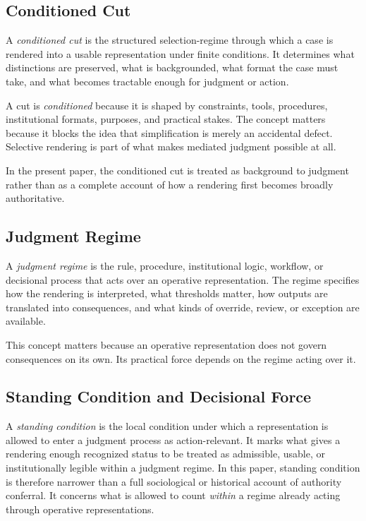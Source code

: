 \documentclass[11pt]{article}
\renewcommand{\emph}[1]{\textit{#1}}
\begin{document}
\subsection{Conditioned Cut}

A \emph{conditioned cut} is the structured selection-regime through which a case is rendered into a usable representation under finite conditions. It determines what distinctions are preserved, what is backgrounded, what format the case must take, and what becomes tractable enough for judgment or action.

A cut is \emph{conditioned} because it is shaped by constraints, tools, procedures, institutional formats, purposes, and practical stakes. The concept matters because it blocks the idea that simplification is merely an accidental defect. Selective rendering is part of what makes mediated judgment possible at all.

In the present paper, the conditioned cut is treated as background to judgment rather than as a complete account of how a rendering first becomes broadly authoritative.

\subsection{Judgment Regime}

A \emph{judgment regime} is the rule, procedure, institutional logic, workflow, or decisional process that acts over an operative representation. The regime specifies how the rendering is interpreted, what thresholds matter, how outputs are translated into consequences, and what kinds of override, review, or exception are available.

This concept matters because an operative representation does not govern consequences on its own. Its practical force depends on the regime acting over it.

\subsection{Standing Condition and Decisional Force}

A \emph{standing condition} is the local condition under which a representation is allowed to enter a judgment process as action-relevant. It marks what gives a rendering enough recognized status to be treated as admissible, usable, or institutionally legible within a judgment regime. In this paper, standing condition is therefore narrower than a full sociological or historical account of authority conferral. It concerns what is allowed to count \emph{within} a regime already acting through operative representations.
\end{document}
